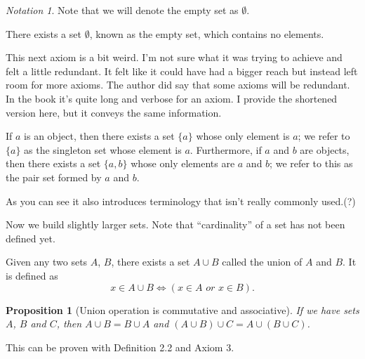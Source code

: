 \documentclass[12pt]{article}
\newtheorem{proposition}{Proposition}[section]
\theoremstyle{remark}
\newtheorem*{notation}{Notation}
\begin{document}
\begin{notation}
    Note that we will denote the empty set as $ \emptyset $.
\end{notation}


\begin{important}
     There exists a set $ \emptyset $, known as the empty set, which contains no elements. 
\end{important}


This next axiom is a bit weird. I'm not sure what it was trying to achieve and felt a little redundant. It felt like it could have had a bigger reach but instead left room for more axioms. The author did say that some axioms will be redundant. In the book it's quite long and verbose for an axiom. I provide the shortened version here, but it conveys the same information. 


\begin{important}
 	If $ a $ is an object, then there exists a set $ \{a\} $ whose only element is $ a $; we refer to $ \{a\} $ as the singleton set whose element is $ a $. Furthermore, if $ a $ and $ b $ are objects, then there exists a set $ \{a,b\} $ whose only elements are $ a $ and $ b $; we refer to this as the pair set formed by $ a $ and $ b $.
\end{important}

As you can see it also introduces terminology that isn't really commonly used.(?) \par 

Now we build slightly larger sets. Note that ``cardinality'' of a set has not been defined yet. 


\begin{important}
 	Given any two sets $ A $, $ B $, there exists a set $ A \cup B $ called the union of $ A $ and $ B $. It is defined as \[ x \in A \cup B \iff (x \in A \textit{ or } x \in B). \]
\end{important}


\begin{proposition}[Union operation is commutative and associative]
    If we have sets $ A $, $ B $ and $ C $, then $ A \cup B = B \cup A $ and $ (A \cup B) \cup C = A \cup (B \cup C) $.
\end{proposition}

This can be proven with Definition 2.2 and Axiom 3.
\end{document}
